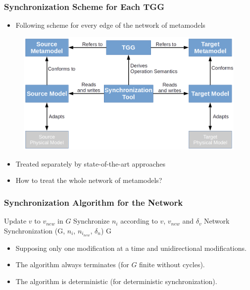 \documentclass{beamer}
\begin{document}
\begin{frame}[t]
	\frametitle{Synchronization Scheme for Each TGG}
	\begin{itemize}
		\item Following scheme for every edge of the network of metamodels
	\end{itemize}
	\pause
	\begin{figure}
		\includegraphics[width=.8\textwidth]{synchronization_scheme}
	\end{figure}
	\nocite{czarnecki2006feature}
	\nocite{giese2010model}
	\pause
	\begin{itemize}
		\item Treated separately by state-of-the-art approaches
		\pause
		\item How to treat the whole network of metamodels?
	\end{itemize}
\end{frame}

\begin{frame}[t]
	\frametitle{Synchronization Algorithm for the Network}
	{\footnotesize 
		\begin{algorithmic}
				\State Update $v$ to $v_{new}$ in $G$
								\State Synchronize $n_i$ according to $v$, $v_{new}$ and $\delta_v$
									\State Network Synchronization (G, $n_i$, $n_{i_{new}}$, $\delta_n$)
								\EndIf
							\EndFor
				\State \Return G
			\EndFunction
		\end{algorithmic}
	}
	\pause
	\begin{itemize}
		\item Supposing only one modification at a time and unidirectional modifications.
		\item The algorithm always terminates (for $G$ finite without cycles).
		\item The algorithm is deterministic (for deterministic synchronization).
	\end{itemize}
\end{frame}
\end{document}
